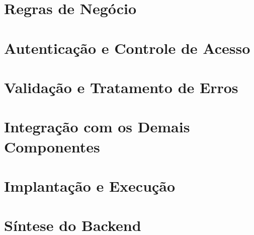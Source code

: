 
\section{Regras de Negócio}
\label{sec:regras-negocio-backend}


\section{Autenticação e Controle de Acesso}
\label{sec:autenticacao-backend}


\section{Validação e Tratamento de Erros}
\label{sec:validacao-erros-backend}


\section{Integração com os Demais Componentes}
\label{sec:integracao-backend}


\section{Implantação e Execução}
\label{sec:implantacao-backend}


\section{Síntese do Backend}
\label{sec:sintese-backend}

